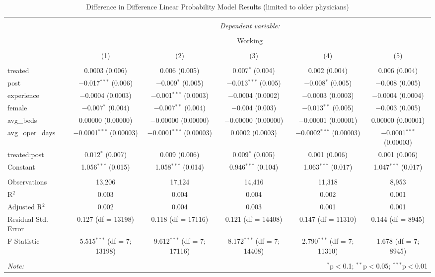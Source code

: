 
\begin{table}[!htbp] \centering 
  \caption{Difference in Difference Linear Probability Model Results (limited to older physicians)} 
  \label{} 
\small 
\begin{tabular}{@{\extracolsep{3pt}}lccccc} 
\\[-1.8ex]\hline 
\hline \\[-1.8ex] 
 & \multicolumn{5}{c}{\textit{Dependent variable:}} \\ 
\cline{2-6} 
\\[-1.8ex] & \multicolumn{5}{c}{Working} \\ 
\\[-1.8ex] & (1) & (2) & (3) & (4) & (5)\\ 
\hline \\[-1.8ex] 
 treated & 0.0003 (0.006) & 0.006 (0.005) & 0.007$^{*}$ (0.004) & 0.002 (0.004) & 0.006 (0.004) \\ 
  post & $-$0.017$^{***}$ (0.006) & $-$0.009$^{*}$ (0.005) & $-$0.013$^{***}$ (0.005) & $-$0.008$^{*}$ (0.005) & $-$0.008 (0.005) \\ 
  experience & $-$0.0004 (0.0003) & $-$0.001$^{***}$ (0.0003) & $-$0.0004 (0.0002) & $-$0.0003 (0.0003) & $-$0.0004 (0.0004) \\ 
  female & $-$0.007$^{*}$ (0.004) & $-$0.007$^{**}$ (0.004) & $-$0.004 (0.003) & $-$0.013$^{**}$ (0.005) & $-$0.003 (0.005) \\ 
  avg\_beds & 0.00000 (0.00000) & $-$0.00000 (0.00000) & $-$0.00000 (0.00000) & $-$0.00001 (0.00001) & 0.00000 (0.00001) \\ 
  avg\_oper\_days & $-$0.0001$^{***}$ (0.00003) & $-$0.0001$^{***}$ (0.00003) & 0.0002 (0.0003) & $-$0.0002$^{***}$ (0.00003) & $-$0.0001$^{***}$ (0.00003) \\ 
  treated:post & 0.012$^{*}$ (0.007) & 0.009 (0.006) & 0.009$^{*}$ (0.005) & 0.001 (0.006) & 0.001 (0.006) \\ 
  Constant & 1.056$^{***}$ (0.015) & 1.058$^{***}$ (0.014) & 0.946$^{***}$ (0.104) & 1.063$^{***}$ (0.017) & 1.047$^{***}$ (0.017) \\ 
 \hline \\[-1.8ex] 
Observations & 13,206 & 17,124 & 14,416 & 11,318 & 8,953 \\ 
R$^{2}$ & 0.003 & 0.004 & 0.004 & 0.002 & 0.001 \\ 
Adjusted R$^{2}$ & 0.002 & 0.004 & 0.003 & 0.001 & 0.001 \\ 
Residual Std. Error & 0.127 (df = 13198) & 0.118 (df = 17116) & 0.121 (df = 14408) & 0.147 (df = 11310) & 0.144 (df = 8945) \\ 
F Statistic & 5.515$^{***}$ (df = 7; 13198) & 9.612$^{***}$ (df = 7; 17116) & 8.172$^{***}$ (df = 7; 14408) & 2.790$^{***}$ (df = 7; 11310) & 1.678 (df = 7; 8945) \\ 
\hline 
\hline \\[-1.8ex] 
\textit{Note:}  & \multicolumn{5}{r}{$^{*}$p$<$0.1; $^{**}$p$<$0.05; $^{***}$p$<$0.01} \\ 
\end{tabular} 
\end{table} 
